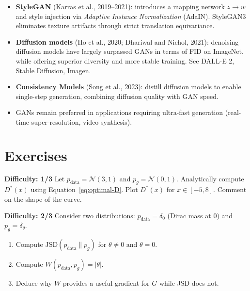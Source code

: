 \begin{sota}[title=\textbf{Beyond classical GANs}]
\begin{itemize}
    \item \textbf{StyleGAN} (Karras et al., 2019--2021): introduces a mapping network $z \to w$ and style injection via \emph{Adaptive Instance Normalization} (AdaIN). StyleGAN3 eliminates texture artifacts through strict translation equivariance.

    \item \textbf{Diffusion models} (Ho et al., 2020; Dhariwal and Nichol, 2021): denoising diffusion models have largely surpassed GANs in terms of FID on ImageNet, while offering superior diversity and more stable training. See DALL-E 2, Stable Diffusion, Imagen.

    \item \textbf{Consistency Models} (Song et al., 2023): distill diffusion models to enable single-step generation, combining diffusion quality with GAN speed.

    \item GANs remain preferred in applications requiring ultra-fast generation (real-time super-resolution, video synthesis).
\end{itemize}
\end{sota}

\section{Exercises}
\label{sec:gan-exercises}

\begin{exercise}
\label{exo:optimal-disc}
\textbf{Difficulty: 1/3}
Let $p_{\text{data}} = \mathcal{N}(3, 1)$ and $p_g = \mathcal{N}(0, 1)$. Analytically compute $D^*(x)$ using Equation~\eqref{eq:optimal-D}. Plot $D^*(x)$ for $x \in [-5, 8]$. Comment on the shape of the curve.
\end{exercise}

\begin{exercise}
\label{exo:wgan-compare}
\textbf{Difficulty: 2/3}
Consider two distributions: $p_{\text{data}} = \delta_0$ (Dirac mass at 0) and $p_g = \delta_\theta$.
\begin{enumerate}
    \item Compute $\text{JSD}(p_{\text{data}} \| p_g)$ for $\theta \neq 0$ and $\theta = 0$.
    \item Compute $W(p_{\text{data}}, p_g) = |\theta|$.
    \item Deduce why $W$ provides a useful gradient for $G$ while JSD does not.
\end{enumerate}
\end{exercise}

